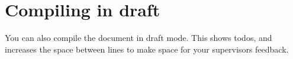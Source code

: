 
\section{Compiling in draft}\label{sec:compiling-in-draft}
You can also compile the document in draft mode.
This shows todos, and increases the space between lines to make space for your supervisors feedback.
